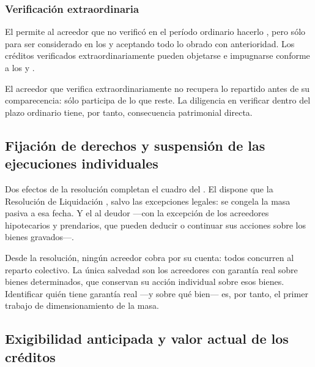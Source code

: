 \subsubsection{Verificación extraordinaria}

El  permite al acreedor que no verificó en el período ordinario hacerlo
, pero sólo para ser
considerado en los  y aceptando todo lo obrado con anterioridad. Los
créditos verificados extraordinariamente pueden objetarse e impugnarse conforme a los 
y .

\begin{alerta}
El acreedor que verifica extraordinariamente no recupera lo repartido antes de su comparecencia:
sólo participa de lo que reste. La diligencia en verificar dentro del plazo ordinario tiene, por
tanto, consecuencia patrimonial directa.
\end{alerta}

\subsection{Fijación de derechos y suspensión de las ejecuciones individuales}

Dos efectos de la resolución completan el cuadro del \desasimiento{}. El  dispone que
la Resolución de Liquidación , salvo las excepciones
legales: se congela la masa pasiva a esa fecha. Y el   al deudor ---con la excepción de los acreedores
hipotecarios y prendarios, que pueden deducir o continuar sus acciones sobre los bienes
gravados---.

\begin{foco}
Desde la resolución, ningún acreedor cobra por su cuenta: todos concurren al reparto colectivo.
La única salvedad son los acreedores con garantía real sobre bienes determinados, que conservan
su acción individual sobre esos bienes. Identificar quién tiene garantía real ---y sobre qué
bien--- es, por tanto, el primer trabajo de dimensionamiento de la masa.
\end{foco}

\subsection{Exigibilidad anticipada y valor actual de los créditos}

